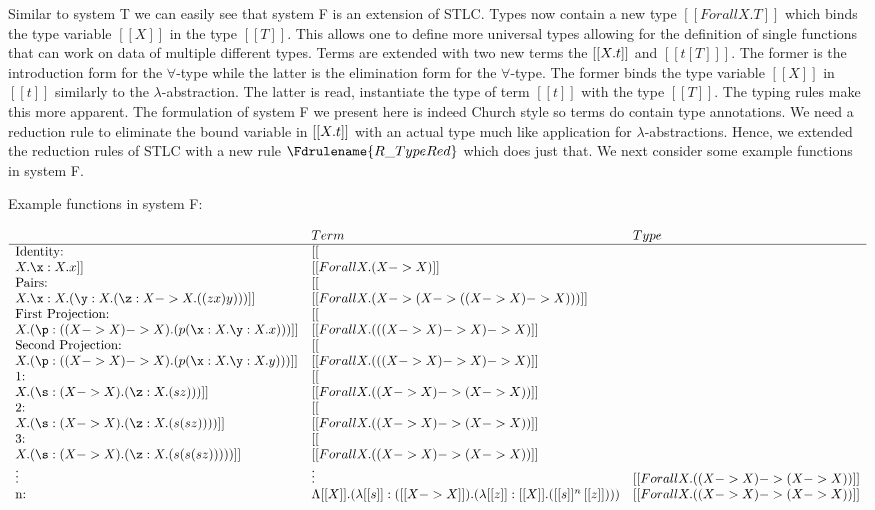 Similar to system T we can easily see that system F is an extension of
STLC.  Types now contain a new type $[[Forall X.T]]$ which binds the
type variable $[[X]]$ in the type $[[T]]$.  This allows one to define
more universal types allowing for the definition of single functions
that can work on data of multiple different types.  Terms are extended
with two new terms the $[[\\X.t]]$ and $[[t [T] ]]$.  The former is
the introduction form for the $\forall$-type while the latter is the
elimination form for the $\forall$-type. The former binds the type
variable $[[X]]$ in $[[t]]$ similarly to the
$\lambda$-abstraction. The latter is read, instantiate the type of
term $[[t]]$ with the type $[[T]]$.  The typing rules make this more
apparent.  The formulation of system F we present here is indeed
Church style so terms do contain type annotations.  We need a
reduction rule to eliminate the bound variable in $[[\\X.t]]$ with an
actual type much like application for $\lambda$-abstractions.  Hence,
we extended the reduction rules of STLC with a new rule
$\Fdrulename{R\_TypeRed}$ which does just that.  We next consider some
example functions in system F.
\begin{example}
  \label{ex:F_terms}
  Example functions in system F:
  \begin{center}
    \begin{math}
      \begin{array}{lll}
                         & Term           & Type\\
        \hline
\text{Identity:} & [[\\X.\x:X.x]] & [[Forall X.(X -> X)]]\\
\text{Pairs:}    & [[\\X.\x:X.(\y:X.(\z:X->X.((z x) y)))]] & [[Forall X.(X->(X->((X->X)->X)))]]\\
\text{First Projection:} & [[\\X.(\p:((X -> X)->X).(p (\x:X.\y:X.x)))]] & [[Forall X.(((X->X)->X)->X)]]\\
\text{Second Projection:} & [[\\X.(\p:((X -> X)->X).(p (\x:X.\y:X.y)))]] & [[Forall X.(((X->X)->X)->X)]]\\
\text{1:} & [[\\X.(\s:(X->X).(\z:X.(s z)))]] & [[Forall X.((X->X)->(X->X))]]\\
\text{2:} & [[\\X.(\s:(X->X).(\z:X.(s (s z))))]] & [[Forall X.((X->X)->(X->X))]]\\
\text{3:} & [[\\X.(\s:(X->X).(\z:X.(s (s (s z)))))]] & [[Forall X.((X->X)->(X->X))]]\\
\vdots    & \vdots                                   & [[Forall X.((X->X)->(X->X))]]\\
\text{n:} & \Lambda [[X]].(\lambda [[s]]:([[X->X]]).(\lambda[[z]]:[[X]].([[s]]^n\,[[z]]))) & [[Forall X.((X->X)->(X->X))]]\\
      \end{array}
    \end{math}
  \end{center}
\end{example}
